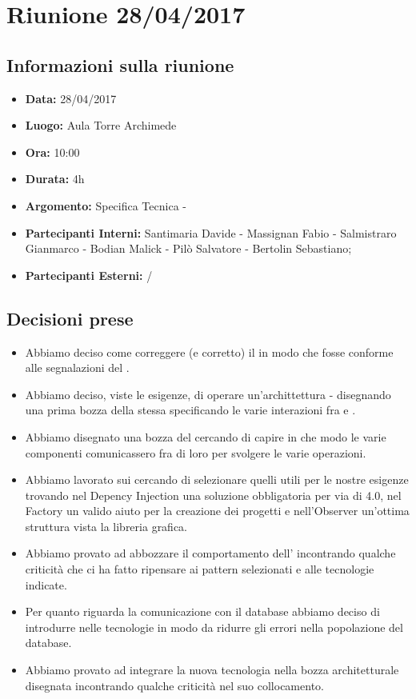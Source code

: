 \section{Riunione 28/04/2017}
  \subsection{Informazioni sulla riunione}
    \begin{itemize}
      \item \textbf{Data: }28/04/2017
      \item \textbf{Luogo: }Aula Torre Archimede
      \item \textbf{Ora: }10:00
      \item \textbf{Durata: }4h
      \item \textbf{Argomento: }Specifica Tecnica - 
      \item \textbf{Partecipanti Interni: }Santimaria Davide - Massignan Fabio - Salmistraro Gianmarco - Bodian Malick - Pilò Salvatore - Bertolin Sebastiano;
      \item \textbf{Partecipanti Esterni: }/
    \end{itemize}
  \subsection{Decisioni prese}
		\begin{itemize}
			\item Abbiamo deciso come correggere (e corretto) il \versionePP in modo che fosse conforme alle segnalazioni del .
      \item Abbiamo deciso, viste le esigenze, di operare un'archittettura - disegnando una prima bozza della stessa specificando le varie interazioni
        fra  e .
      \item Abbiamo disegnato una bozza del  cercando di capire in che modo le varie componenti comunicassero fra di loro per svolgere le varie operazioni.
      \item Abbiamo lavorato sui  cercando di selezionare quelli utili per le nostre esigenze trovando nel Depency Injection una soluzione obbligatoria
        per via di  4.0, nel Factory un valido aiuto per la creazione dei progetti e nell'Observer un'ottima struttura vista la libreria grafica.
      \item Abbiamo provato ad abbozzare il comportamento dell' incontrando qualche criticità che ci ha fatto ripensare ai pattern selezionati e alle tecnologie
        indicate.
      \item Per quanto riguarda la comunicazione con il database abbiamo deciso di introdurre  nelle tecnologie in modo da ridurre gli errori nella popolazione del
        database.
      \item Abbiamo provato ad integrare la nuova tecnologia nella bozza architetturale disegnata incontrando qualche criticità nel suo collocamento.
		\end{itemize}
